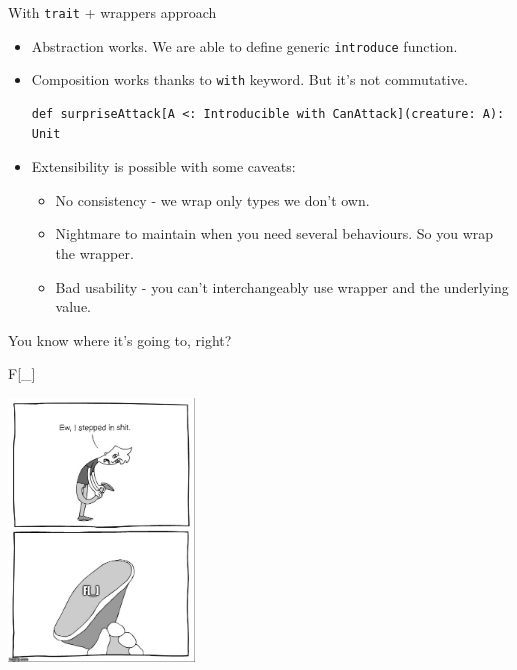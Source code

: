 \documentclass[presentation,aspectratio=169,smaller]{beamer}
\begin{document}
\begin{frame}[label={sec:orgce6abd8},fragile]{With \texttt{trait} + wrappers approach}
 \begin{itemize}
\item Abstraction works. We are able to define generic \texttt{introduce} function.
\item Composition works thanks to \texttt{with} keyword. But it's not commutative.
\begin{verbatim}
def surpriseAttack[A <: Introducible with CanAttack](creature: A): Unit
\end{verbatim}
\item Extensibility is possible with some caveats:
\begin{itemize}
\item No consistency - we wrap only types we don't own.
\item Nightmare to maintain when you need several behaviours. So you wrap the
wrapper.
\item Bad usability - you can’t interchangeably use wrapper and the underlying
value.
\end{itemize}
\end{itemize}

\pause

You know where it’s going to, right?
\end{frame}

\begin{frame}[label={sec:org4002be2}]{F[\_]}
\begin{center}
\includegraphics[height=7cm]{images/f_.jpg}
\end{center}
\end{frame}
\end{document}
